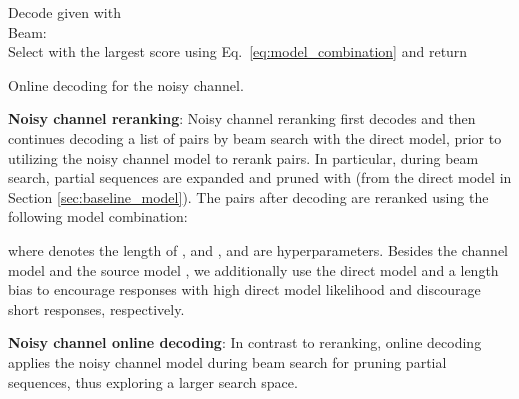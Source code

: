 \documentclass[11pt,a4paper]{article}
\begin{document}
\begin{algorithm}[t]
\footnotesize
\SetAlgoLined
{}
 Decode  given  with  \\
 Beam:  \\
 Select  with the largest score using Eq.\ \ref{eq:model_combination} and return 
 \caption{\normalsize Online decoding for the noisy channel. \label{al:noisy_channel}}
\end{algorithm}

\textbf{Noisy channel reranking}: Noisy channel reranking first decodes  and then continues decoding a list  of  pairs by beam search with the direct model, prior to utilizing the noisy channel model to rerank  pairs. In particular, during beam search, partial sequences are expanded and pruned with  (from the direct model in Section \ref{sec:baseline_model}). The pairs after decoding are reranked using the following model combination:

where  denotes the length of , and ,  and  are hyperparameters. Besides the channel model  and the source model , we additionally use the direct model  and a length bias  to encourage responses with high direct model likelihood and discourage short responses, respectively.

\textbf{Noisy channel online decoding}: In contrast to reranking, online decoding applies the noisy channel model during beam search for pruning partial sequences, thus exploring a larger search space.
\end{document}
